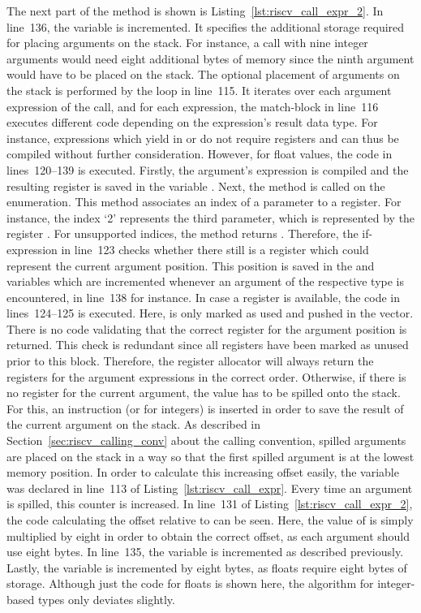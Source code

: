 The next part of the  method is shown is Listing~\ref{lst:riscv_call_expr_2}.
In line~136, the  variable is incremented.
It specifies the additional storage required for placing arguments on the stack.
For instance, a call with nine integer arguments would need eight additional bytes of memory since the ninth argument would have to be placed on the stack.
The optional placement of arguments on the stack is performed by the loop in line~115.
It iterates over each argument expression of the call, and for each expression, the match-block in line~116 executes different code depending on the expression's result data type.
For instance, expressions which yield in \qVerb{()} or \qVerb{!} do not require registers and can thus be compiled without further consideration.
However, for float values, the code in lines~120--139 is executed.
Firstly, the argument's expression is compiled and the resulting register is saved in the variable .
Next, the  method is called on the  enumeration.
This method associates an index of a parameter to a register.
For instance, the index `2' represents the third parameter, which is represented by the register .
For unsupported indices, the method returns .
Therefore, the if-expression in line~123 checks whether there still is a register which could represent the current argument position.
This position is saved in the  and  variables which are incremented whenever an argument of the respective type is encountered, in line~138 for instance.
In case a register is available, the code in lines~124--125 is executed.
Here,  is only marked as used and pushed in the  vector.
There is no code validating that the correct register for the argument position is returned.
This check is redundant since all registers have been marked as unused prior to this block.
Therefore, the register allocator will always return the registers for the argument expressions in the correct order.
Otherwise, if there is no register for the current argument, the value has to be spilled onto the stack.
For this, an  instruction (or  for integers) is inserted in order to save the result of the current argument on the stack.
As described in Section~\ref{sec:riscv_calling_conv} about the \riscv{} calling convention, spilled arguments are placed on the stack in a way so that the first spilled argument is at the lowest memory position.
In order to calculate this increasing offset easily, the  variable was declared in line~113 of Listing~\ref{lst:riscv_call_expr}.
Every time an argument is spilled, this counter is increased.
In line~131 of Listing~\ref{lst:riscv_call_expr_2}, the code calculating the offset relative to  can be seen.
Here, the value of  is simply multiplied by eight in order to obtain the correct offset, as each argument should use eight bytes.
In line~135, the  variable is incremented as described previously.
Lastly, the  variable is incremented by eight bytes, as floats require eight bytes of storage.
Although just the code for floats is shown here, the algorithm for integer-based types only deviates slightly.

